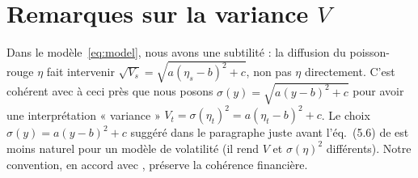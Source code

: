 \documentclass[11pt,a4paper]{article}
\theoremstyle{definition}
\newcommand{\1}{\mathbf{1}}
\begin{document}
\section{Remarques sur la variance $V$}

Dans le modèle~\eqref{eq:model}, nous avons une subtilité : la diffusion du
poisson-rouge $\eta$ fait intervenir $\sqrt{V_s} = \sqrt{a(\eta_s-b)^2+c}$, non
pas $\eta$ directement. C'est cohérent avec \cite[éq.~(5.6)--(5.7)]{BCGP23} à
ceci près que nous posons $\sigma(y) = \sqrt{a(y-b)^2+c}$ pour avoir une
interprétation « variance » $V_t = \sigma(\eta_t)^2 = a(\eta_t-b)^2+c$. Le
choix $\sigma(y) = a(y-b)^2+c$ suggéré dans le paragraphe juste avant
l'éq.~(5.6) de \cite{BCGP23} est moins naturel pour un modèle de volatilité
(il rend $V$ et $\sigma(\eta)^2$ différents). Notre convention, en accord avec
\cite{GJR20}, préserve la cohérence financière.
\end{document}
